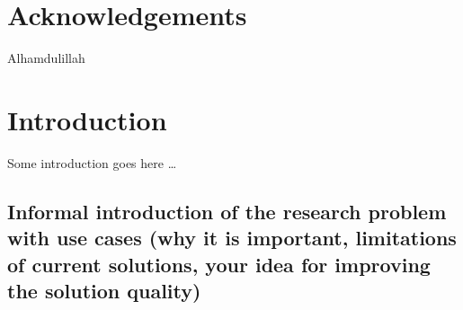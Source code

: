 \documentclass[]{article}
\begin{document}
\makeatletter
{}
\newenvironment{no-prefix-table-caption}{
  \let\LT@makecaption=\LT@makenoprefixcaption
  \renewcommand\thetable{x.\thetableno}
  \renewcommand\theHtable{x.\thetableno}
  \stepcounter{tableno}
}{
  \let\thetable=\oldthetable
  \let\theHtable=\oldtheHtable
  \let\LT@makecaption=\LT@oldmakecaption
  \addtocounter{table}{-1}
}
\makeatother

\makeatletter
\long{}
\makeatother

\makeatletter
\let\@oldmakecaption=\@makecaption
\let\oldthefigure=\thefigure
\let\oldtheHfigure=\theHfigure
\makeatother

\makeatletter
{}
\newenvironment{no-prefix-figure-caption}{
  \let\@makecaption=\@makenoprefixcaption
  \renewcommand\thefigure{x.\thefigno}
  \renewcommand\theHfigure{x.\thefigno}
  \stepcounter{figno}
}{
  \let\thefigure=\oldthefigure
  \let\theHfigure=\oldtheHfigure
  \let\@makecaption=\@oldmakecaption
  \addtocounter{figure}{-1}
}
\makeatother

\thispagestyle{empty} \section*{\centering Acknowledgements}

\begin{center}
Alhamdulillah
\end{center}

\doublespacing

\section{Introduction}\label{introduction}

Some introduction goes here \ldots{}

\subsection{Informal introduction of the research problem with use cases
(why it is important, limitations of current solutions, your idea for
improving the solution
quality)}\label{informal-introduction-of-the-research-problem-with-use-cases-why-it-is-important-limitations-of-current-solutions-your-idea-for-improving-the-solution-quality}
\end{document}
